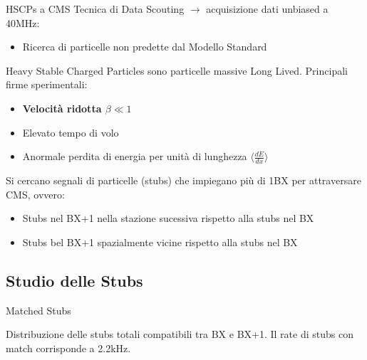 \documentclass{beamer}
\begin{document}
\begin{frame}{HSCPs a CMS}
    Tecnica di Data Scouting $\rightarrow$ acquisizione dati unbiased a 40MHz:
    \begin{itemize}
        \item Ricerca di particelle non predette dal Modello Standard
    \end{itemize}

    \vspace{0.3 cm}
    
    Heavy Stable Charged Particles sono particelle massive Long Lived. Principali firme sperimentali:
    \begin{itemize}
        \item \textbf{Velocità ridotta $\beta \ll 1$}
        \item Elevato tempo di volo
        \item Anormale perdita di energia per unità di lunghezza $\langle \frac{dE}{dx}\rangle$
    \end{itemize}

    \vspace{0.3 cm}

    Si cercano segnali di particelle (stubs) che impiegano più di 1BX per attraversare CMS, ovvero:
    \begin{itemize}
        \item Stubs nel BX+1 nella stazione sucessiva rispetto alla stubs nel BX
        \item Stubs bel BX+1 spazialmente vicine rispetto alla stubs nel BX
    \end{itemize}
\end{frame}



\subsection{Studio delle Stubs}
\begin{frame}{Matched Stubs}

Distribuzione delle stubs totali compatibili tra BX e BX+1. Il rate di stubs con match corrisponde a 2.2kHz. 

\vspace{0.6cm}

\begin{columns}

    \begin{column}{0.5\textwidth}
    \end{column}
    \begin{column}{0.5\textwidth}
    \end{column}
\end{columns}

\vspace{0.5 cm}
    
\end{frame}
\end{document}
